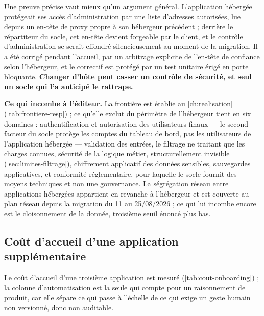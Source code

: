 Une preuve précise vaut mieux qu'un argument général. L'application hébergée protégeait ses accès
d'administration par une liste d'adresses autorisées, lue depuis un en-tête de proxy propre à son
hébergeur précédent ; derrière le répartiteur du socle, cet en-tête devient forgeable par le client,
et le contrôle d'administration se serait effondré silencieusement au moment de la migration. Il a
été corrigé pendant l'accueil, par un arbitrage explicite de l'en-tête de confiance selon
l'hébergeur, et le correctif est protégé par un test unitaire érigé en porte bloquante.
\textbf{Changer d'hôte peut casser un contrôle de sécurité, et seul un socle qui l'a anticipé le
rattrape.}

\textbf{Ce qui incombe à l'éditeur.} La frontière est établie au \cref{ch:realisation}
(\cref{tab:frontiere-resp}) ; ce qu'elle exclut du périmètre de l'hébergeur tient en six
domaines : authentification et autorisation des utilisateurs finaux --- le second facteur du socle
protège les comptes du tableau de bord, pas les utilisateurs de l'application hébergée ---
validation des entrées, le filtrage ne traitant que les charges connues, sécurité de la logique
métier, structurellement invisible (\cref{sec:limites-filtrage}), chiffrement applicatif des
données sensibles, sauvegardes applicatives, et conformité réglementaire, pour laquelle le socle
fournit des moyens techniques et non une gouvernance. La ségrégation réseau entre applications
hébergées appartient en revanche à l'hébergeur et est couverte au plan réseau depuis la migration
du 11 au 25/08/2026 ; ce qui lui incombe encore est le cloisonnement de la donnée, troisième seuil
énoncé plus bas.

\subsection{Coût d'accueil d'une application supplémentaire}

Le coût d'accueil d'une troisième application est mesuré (\cref{tab:cout-onboarding}) ; la colonne
d'automatisation est la seule qui compte pour un raisonnement de produit, car elle sépare ce qui
passe à l'échelle de ce qui exige un geste humain non versionné, donc non auditable.

